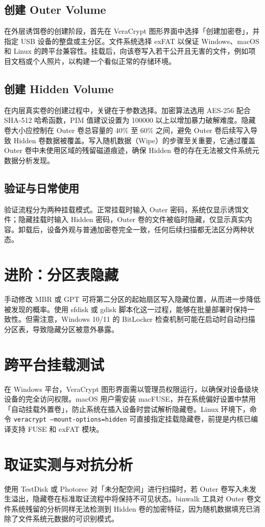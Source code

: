 \section{创建 Outer Volume}
在外层诱饵卷的创建阶段，首先在 VeraCrypt 图形界面中选择「创建加密卷」，并指定 USB 设备的整盘或主分区。文件系统选择 exFAT 以保证 Windows、macOS 和 Linux 的跨平台兼容性。挂载后，向该卷写入若干公开且无害的文件，例如项目文档或个人照片，以构建一个看似正常的存储环境。\par
\section{创建 Hidden Volume}
在内层真实卷的创建过程中，关键在于参数选择。加密算法选用 AES-256 配合 SHA-512 哈希函数，PIM 值建议设置为 100000 以上以增加暴力破解难度。隐藏卷大小应控制在 Outer 卷总容量的 40\%{} 至 60\%{} 之间，避免 Outer 卷后续写入导致 Hidden 卷数据被覆盖。写入随机数据（Wipe）的步骤至关重要，它通过覆盖 Outer 卷中未使用区域的残留磁道痕迹，确保 Hidden 卷的存在无法被文件系统元数据分析发现。\par
\section{验证与日常使用}
验证流程分为两种挂载模式。正常挂载时输入 Outer 密码，系统仅显示诱饵文件；隐藏挂载时输入 Hidden 密码，Outer 卷的文件被临时隐藏，仅显示真实内容。卸载后，设备外观与普通加密卷完全一致，任何后续扫描都无法区分两种状态。\par
\chapter{进阶：分区表隐藏}
手动修改 MBR 或 GPT 可将第二分区的起始扇区写入隐藏位置，从而进一步降低被发现的概率。使用 sfdisk 或 gdisk 脚本化这一过程，能够在批量部署时保持一致性。但需注意，Windows 10/11 的 BitLocker 检查机制可能在启动时自动扫描分区表，导致隐藏分区被意外暴露。\par
\chapter{跨平台挂载测试}
在 Windows 平台，VeraCrypt 图形界面需以管理员权限运行，以确保对设备级块设备的完全访问权限。macOS 用户需安装 macFUSE，并在系统偏好设置中禁用「自动挂载外置卷」，防止系统在插入设备时尝试解析隐藏卷。Linux 环境下，命令 \texttt{veracrypt --mount-options=hidden} 可直接指定挂载隐藏卷，前提是内核已编译支持 FUSE 和 exFAT 模块。\par
\chapter{取证实测与对抗分析}
使用 TestDisk 或 Photorec 对「未分配空间」进行扫描时，若 Outer 卷写入未发生溢出，隐藏卷在标准取证流程中将保持不可见状态。binwalk 工具对 Outer 卷文件系统残留的分析同样无法检测到 Hidden 卷的加密特征，因为随机数据填充已消除了文件系统元数据的可识别模式。\par
